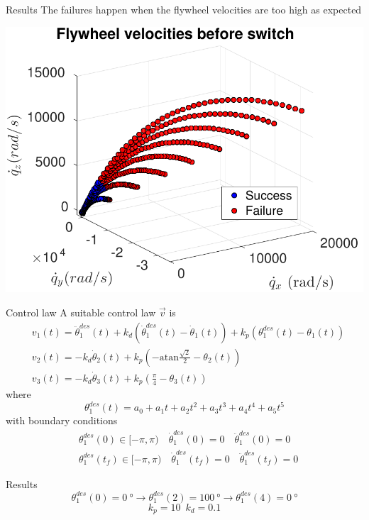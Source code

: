 \begin{frame}{Results \hfill \color{red}{XYZ}}
  The failures happen when the flywheel velocities are too high as expected
  \par
  \centering
  \includegraphics[scale=0.62]{simulation_lqr_velocities}
\end{frame}

\begin{frame}{Control law \hfill \color{dgreen}{ZYX}}
  A suitable control law $\vec{v}$ is
  {\small
    \[
    \begin{split}
      &v_1(t) = \ddot{\theta}_1^{des}(t) + k_d(\dot{\theta}_1^{des}(t) - \dot{\theta}_1(t)) + k_p (\theta_1^{des}(t) - \theta_1(t))\\
      &v_2(t) = - k_d\dot{\theta}_2(t) + k_p \left(-\mathrm{atan}\frac{\sqrt{2}}{2} - \theta_2(t)\right)\\
      &v_3(t) = - k_d\dot{\theta}_3(t) + k_p \left(\frac{\pi}{4} - \theta_3(t)\right)
    \end{split}
    \]
  }
  where
  \[
  \theta_1^{des}(t) = a_0 + a_1 t + a_2 t^2 + a_3 t^3 + a_4 t^4 + a_5 t^5
  \]
  with boundary conditions
  \[
  \begin{split}
    &\theta_1^{des}(0) \in [-\pi, \pi) \quad \dot{\theta}_1^{des}(0)= 0 \quad \ddot{\theta}_1^{des}(0) = 0\\
      &\theta_1^{des}(t_{f}) \in [-\pi, \pi)  \quad \dot{\theta}_1^{des}(t_{f})= 0 \quad \ddot{\theta}_1^{des}(t_{f}) = 0
  \end{split}
  \]
\end{frame}

\begin{frame}{Results \hfill \color{dgreen}{ZYX}}
  \[\theta_1^{des}(0) = \SI{0}{\degree} \rightarrow \theta_1^{des}(2) = \SI{100}{\degree}
  \rightarrow \theta_1^{des}(4) = \SI{0}{\degree}\]
  \[k_p = 10 \enspace k_d = 0.1\]
  \begin{center}
  \end{center}
\end{frame}

